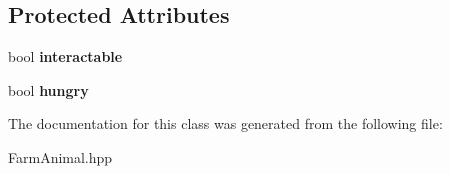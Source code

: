 \subsection*{Protected Attributes}
\begin{DoxyCompactItemize}
\item 
\mbox{\label{class_farm_animal_adfdcfc87d879c884c3498cc6101289c3}} 
bool {\bfseries interactable}
\item 
\mbox{\label{class_farm_animal_aef3b4a396f52764547171d5b2bc44d8b}} 
bool {\bfseries hungry}
\end{DoxyCompactItemize}


The documentation for this class was generated from the following file\+:\begin{DoxyCompactItemize}
\item 
Farm\+Animal.\+hpp\end{DoxyCompactItemize}
